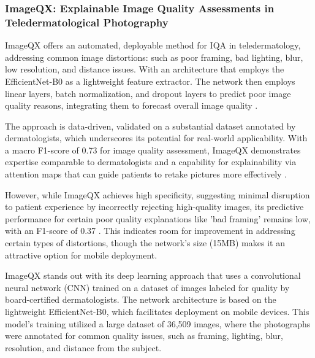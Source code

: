 \subsubsection{ImageQX: Explainable Image Quality Assessments in Teledermatological Photography}
\label{subsub:ImageQX}
ImageQX offers an automated, deployable method for IQA in teledermatology, addressing common image distortions: such as poor framing, bad lighting, blur, low resolution, and distance issues. With an architecture that employs the EfficientNet-B0 as a lightweight feature extractor. The network then employs linear layers, batch normalization, and dropout layers to predict poor image quality reasons, integrating them to forecast overall image quality \autocite{ImageQX}.
\par
\vspace{\baselineskip}
\noindent
The approach is data-driven, validated on a substantial dataset annotated by dermatologists, which underscores its potential for real-world applicability. With a macro F1-score of 0.73 for image quality assessment, ImageQX demonstrates expertise comparable to dermatologists and a capability for explainability via attention maps that can guide patients to retake pictures more effectively \autocite{ImageQX}.
\par
\vspace{\baselineskip}
\noindent
However, while ImageQX achieves high specificity, suggesting minimal disruption to patient experience by incorrectly rejecting high-quality images, its predictive performance for certain poor quality explanations like 'bad framing' remains low, with an F1-score of 0.37 \autocite{ImageQX}. This indicates room for improvement in addressing certain types of distortions, though the network’s size (15MB) makes it an attractive option for mobile deployment.
\par
\vspace{\baselineskip}
\vspace{\baselineskip}
\noindent
ImageQX stands out with its deep learning approach that uses a convolutional neural network (CNN) trained on a dataset of images labeled for quality by board-certified dermatologists. The network architecture is based on the lightweight EfficientNet-B0, which facilitates deployment on mobile devices. This model's training utilized a large dataset of 36,509 images, where the photographs were annotated for common quality issues, such as framing, lighting, blur, resolution, and distance from the subject.
\par
\vspace{\baselineskip}
